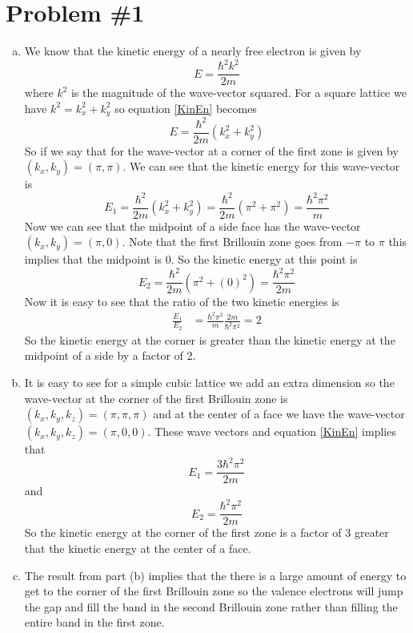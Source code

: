 \documentclass[11pt]{article}
\numberwithin{equation}{section}
\begin{document}


\section{Problem \#1}
\begin{enumerate}[(a)]
\item
We know that the kinetic energy of a nearly free electron is given by
\begin{equation}
E = \frac{\hbar^2k^2}{2m}
\label{KinEn}
\end{equation}
where $k^2$ is the magnitude of the wave-vector squared. For a square lattice we have $k^2 = k_x^2+k_y^2$ so equation \ref{KinEn} becomes
$$ E = \frac{\hbar^2}{2m}(k_x^2+k_y^2)$$ 
So if we say that for the wave-vector at a corner of the first zone is given by $(k_x,k_y) = (\pi,\pi)$. We can see that the kinetic energy for this wave-vector is
$$E_{1} = \frac{\hbar^2}{2m}(k_x^2+k_y^2) = \frac{\hbar^2}{2m}(\pi^2+\pi^2) = \frac{\hbar^2\pi^2}{m}$$ 
Now we can see that the midpoint of a side face has the wave-vector $(k_x,k_y) = (\pi,0)$. Note that the first Brillouin zone goes from $-\pi$ to $\pi$ this implies that the midpoint is $0$. So the kinetic energy at this point is
$$E_{2} = \frac{\hbar^2}{2m}(\pi^2+(0)^2) = \frac{\hbar^2\pi^2}{2m}$$ 
Now it is easy to see that the ratio of the two kinetic energies is
\begin{align*}
\frac{E_1}{E_2} &= \frac{\hbar^2\pi^2}{m}\frac{2m}{\hbar^2\pi^2} = 2
\end{align*}
So the kinetic energy at the corner is greater than the kinetic energy at the midpoint of a side by a factor of 2.


\item
It is easy to see for a simple cubic lattice we add an extra dimension so the wave-vector at the corner of the first Brillouin zone is $(k_x,k_y,k_z) = (\pi,\pi,\pi)$ and at the center of a face we have the wave-vector $(k_x,k_y,k_z) = (\pi,0,0)$. These wave vectors and equation \ref{KinEn} implies that 
$$E_1 = \frac{3\hbar^2\pi^2}{2m}$$
and
$$E_2 = \frac{\hbar^2\pi^2}{2m}$$
So the kinetic energy at the corner of the first zone is a factor of 3 greater that the kinetic energy at the center of a face.

\item
The result from part (b) implies that the there is a large amount of energy to get to the corner of the first Brillouin zone so the valence electrons will jump the gap and fill the band in the second Brillouin zone rather than filling the entire band in the first zone.
\end{enumerate}
\end{document}
